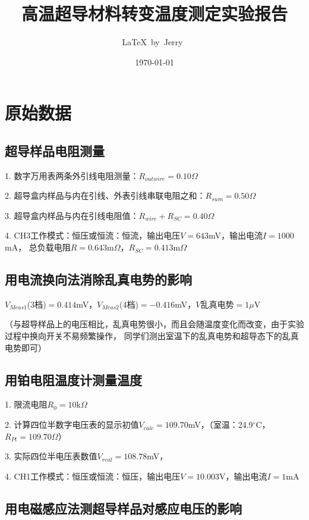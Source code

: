 \documentclass[UTF8]{ctexart}
\title{高温超导材料转变温度测定实验报告}
\author{\LaTeX\ by\ Jerry\ }
\date{\today}
\begin{document}
\fancyfoot[C]{\thepage}

\maketitle
\tableofcontents
\newpage

\section{原始数据}

    \subsection{超导样品电阻测量}

    1. 数字万用表两条外引线电阻测量：$R_{outwire}=0.10\Omega$

    2. 超导盒内样品与内在引线、外表引线串联电阻之和：$R_{sum}=0.50\Omega$

    3. 超导盒内样品与内在引线电阻值：$R_{wire}+R_{SC}=0.40\Omega$

    4. CH3工作模式：恒压或恒流：恒流，输出电压$V=643$mV，输出电流$I=1000$mA，
    总负载电阻$R=0.643$m$\Omega$，$R_{SC}=0.413$m$\Omega$

    \subsection{用电流换向法消除乱真电势的影响}

    $V_{Meas1}$(3档)$=0.414$mV，$V_{Meas2}$(4档)$=-0.416$mV，$V$乱真电势$=1\mu$V

    （与超导样品上的电压相比，乱真电势很小，而且会随温度变化而改变，由于实验过程中换向开关不易频繁操作，
    同学们测出室温下的乱真电势和超导态下的乱真电势即可）

    \subsection{用铂电阻温度计测量温度}

    1. 限流电阻$R_0=10$k$\Omega$

    2. 计算四位半数字电压表的显示初值$V_{calc}=109.70$mV，（室温：24.9$^{\circ}$C，$R_{Pt}=109.70\Omega$）

    3. 实际四位半电压表数值$V_{real}=108.78$mV，

    4. CH1工作模式：恒压或恒流：恒压，输出电压$V=10.003$V，输出电流$I=1$mA

    \subsection{用电磁感应法测超导样品对感应电压的影响}
\end{document}
